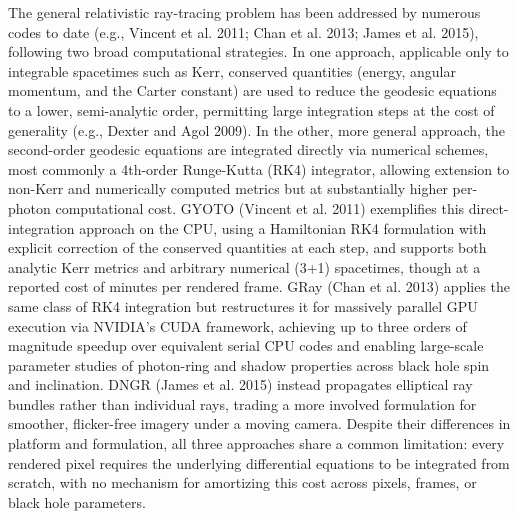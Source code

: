 \documentclass[12pt]{article}
\begin{document}
The general relativistic ray-tracing problem has been addressed by numerous codes to date (e.g., Vincent et al. 2011\cite{vincent2011}; Chan et al. 2013\cite{chan2013}; James et al. 2015\cite{james2015}), following two broad computational strategies. In one approach, applicable only to integrable spacetimes such as Kerr, conserved quantities (energy, angular momentum, and the Carter constant) are used to reduce the geodesic equations to a lower, semi-analytic order, permitting large integration steps at the cost of generality (e.g., Dexter and Agol 2009\cite{dexter2009}). In the other, more general approach, the second-order geodesic equations are integrated directly via numerical schemes, most commonly a 4th-order Runge-Kutta (RK4) integrator, allowing extension to non-Kerr and numerically computed metrics but at substantially higher per-photon computational cost. GYOTO (Vincent et al. 2011\cite{vincent2011}) exemplifies this direct-integration approach on the CPU, using a Hamiltonian RK4 formulation with explicit correction of the conserved quantities at each step, and supports both analytic Kerr metrics and arbitrary numerical (3+1) spacetimes, though at a reported cost of minutes per rendered frame. GRay (Chan et al. 2013\cite{chan2013}) applies the same class of RK4 integration but restructures it for massively parallel GPU execution via NVIDIA's CUDA framework, achieving up to three orders of magnitude speedup over equivalent serial CPU codes and enabling large-scale parameter studies of photon-ring and shadow properties across black hole spin and inclination. DNGR (James et al. 2015\cite{james2015}) instead propagates elliptical ray bundles rather than individual rays, trading a more involved formulation for smoother, flicker-free imagery under a moving camera. Despite their differences in platform and formulation, all three approaches share a common limitation: every rendered pixel requires the underlying differential equations to be integrated from scratch, with no mechanism for amortizing this cost across pixels, frames, or black hole parameters.
\end{document}
